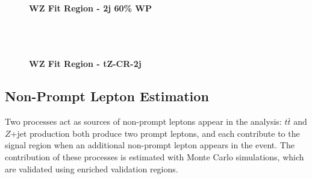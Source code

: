 \begin{figure}%
    \textbf{WZ Fit Region - 2j 60\% WP}\\
    \\
    \\
    \\
    \label{kin:WP_2j_60}
\end{figure}

\begin{figure}[H]
    \textbf{WZ Fit Region - tZ-CR-2j}\\
    \label{kin:tZ_CR_2j}
\end{figure}

\subsection{Non-Prompt Lepton Estimation}
\label{sec:fakes}

Two processes act as sources of non-prompt leptons appear in the analysis: $t\bar{t}$ and $Z$+jet production both produce two prompt leptons, and each contribute to the signal region when an additional non-prompt lepton appears in the event. The contribution of these processes is estimated with Monte Carlo simulations, which are validated using enriched validation regions.

